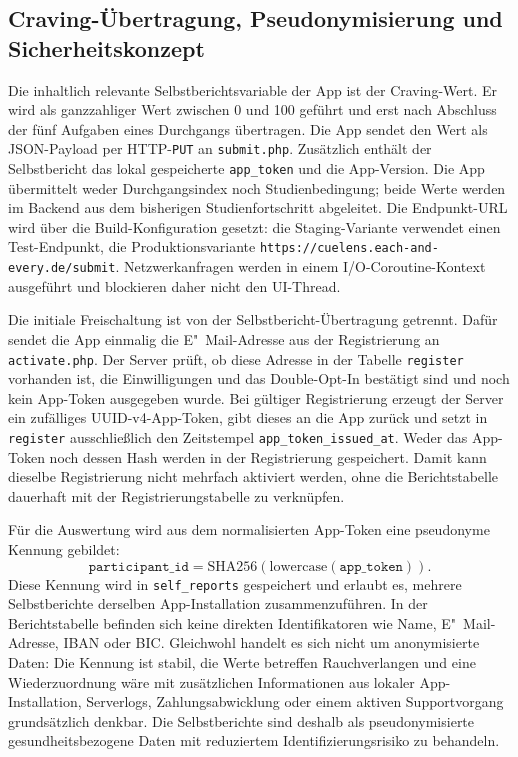 \subsection{Craving-Übertragung, Pseudonymisierung und Sicherheitskonzept}
Die inhaltlich relevante Selbstberichtsvariable der App ist der Craving-Wert. Er wird als ganzzahliger Wert zwischen 0 und 100 geführt und erst nach Abschluss der fünf Aufgaben eines Durchgangs übertragen. Die App sendet den Wert als JSON-Payload per HTTP-\texttt{PUT} an \texttt{submit.php}. Zusätzlich enthält der Selbstbericht das lokal gespeicherte \texttt{app\_token} und die App-Version. Die App übermittelt weder Durchgangsindex noch Studienbedingung; beide Werte werden im Backend aus dem bisherigen Studienfortschritt abgeleitet. Die Endpunkt-URL wird über die Build-Konfiguration gesetzt: die Staging-Variante verwendet einen Test-Endpunkt, die Produktionsvariante \texttt{https://cuelens.each-and-every.de/submit}. Netzwerkanfragen werden in einem I/O-Coroutine-Kontext ausgeführt und blockieren daher nicht den UI-Thread.

Die initiale Freischaltung ist von der Selbstbericht-Übertragung getrennt. Dafür sendet die App einmalig die E"~Mail-Adresse aus der Registrierung an \texttt{activate.php}. Der Server prüft, ob diese Adresse in der Tabelle \texttt{register} vorhanden ist, die Einwilligungen und das Double-Opt-In bestätigt sind und noch kein App-Token ausgegeben wurde. Bei gültiger Registrierung erzeugt der Server ein zufälliges UUID-v4-App-Token, gibt dieses an die App zurück und setzt in \texttt{register} ausschließlich den Zeitstempel \texttt{app\_token\_issued\_at}. Weder das App-Token noch dessen Hash werden in der Registrierung gespeichert. Damit kann dieselbe Registrierung nicht mehrfach aktiviert werden, ohne die Berichtstabelle dauerhaft mit der Registrierungstabelle zu verknüpfen.

Für die Auswertung wird aus dem normalisierten App-Token eine pseudonyme Kennung gebildet:
\[
  \texttt{participant\_id} = \mathrm{SHA256}(\mathrm{lowercase}(\texttt{app\_token})).
\]
Diese Kennung wird in \texttt{self\_reports} gespeichert und erlaubt es, mehrere Selbstberichte derselben App-Installation zusammenzuführen. In der Berichtstabelle befinden sich keine direkten Identifikatoren wie Name, E"~Mail-Adresse, IBAN oder BIC. Gleichwohl handelt es sich nicht um anonymisierte Daten: Die Kennung ist stabil, die Werte betreffen Rauchverlangen und eine Wiederzuordnung wäre mit zusätzlichen Informationen aus lokaler App-Installation, Serverlogs, Zahlungsabwicklung oder einem aktiven Supportvorgang grundsätzlich denkbar. Die Selbstberichte sind deshalb als pseudonymisierte gesundheitsbezogene Daten mit reduziertem Identifizierungsrisiko zu behandeln.

